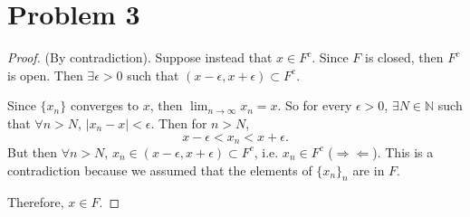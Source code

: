 \documentclass{article}
\begin{document}
\section*{Problem 3}
\begin{proof}
	(By contradiction). Suppose instead that $x \in F^c$. Since $F$ is closed, then $F^c$ is open. Then $\exists \epsilon > 0$ such that $(x-\epsilon, x+\epsilon) \subset F^c$. 
	
	Since $\{x_n\}$ converges to $x$, then $\lim_{n\to\infty}x_n = x$. So for every $\epsilon > 0$, $\exists N \in \mathbb{N}$ such that $\forall n > N$, $|x_n-x|<\epsilon$. Then for $n>N$, 
	\begin{equation}
		x-\epsilon < x_n<x+\epsilon.
	\end{equation}
	But then $\forall n > N$, $x_n \in (x-\epsilon, x+\epsilon)\subset F^c$, i.e. $x_n \in F^c$ ($\Rightarrow\Leftarrow$). This is a contradiction because we assumed that the elements of $\{x_n\}_n$ are in $F$. 
	
	Therefore, $x \in F$.
\end{proof}
\end{document}

